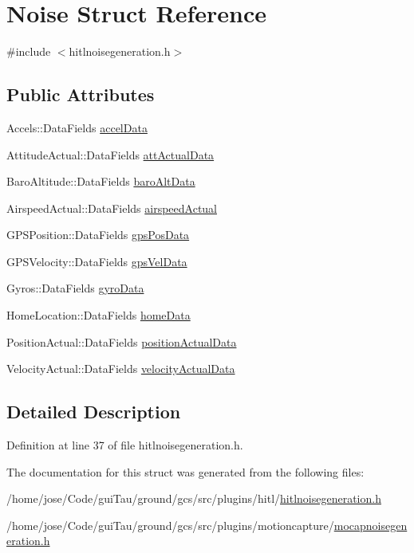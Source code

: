 \hypertarget{struct_noise}{\section{Noise Struct Reference}
\label{struct_noise}
}


{\ttfamily \#include $<$hitlnoisegeneration.\-h$>$}

\subsection*{Public Attributes}
\begin{DoxyCompactItemize}
\item 
Accels\-::\-Data\-Fields \hyperlink{group__hitlplugin_ga20a9e1e87d0a44b532c7e8c44555bdde}{accel\-Data}
\item 
Attitude\-Actual\-::\-Data\-Fields \hyperlink{group__hitlplugin_ga689a709ae944673ff6edd54ab6ca4d7d}{att\-Actual\-Data}
\item 
Baro\-Altitude\-::\-Data\-Fields \hyperlink{group__hitlplugin_gab586e8f2c72c1e42c715debf0bd202b1}{baro\-Alt\-Data}
\item 
Airspeed\-Actual\-::\-Data\-Fields \hyperlink{group__hitlplugin_ga6481423a6f6cc57475e660281ba3d77d}{airspeed\-Actual}
\item 
G\-P\-S\-Position\-::\-Data\-Fields \hyperlink{group__hitlplugin_ga9ec5e3f5256aa25ca8a8556643eb355d}{gps\-Pos\-Data}
\item 
G\-P\-S\-Velocity\-::\-Data\-Fields \hyperlink{group__hitlplugin_gafefa36e4fa6d8da826bbfcf9f604119c}{gps\-Vel\-Data}
\item 
Gyros\-::\-Data\-Fields \hyperlink{group__hitlplugin_gaf3fae05e7092b987f81f25ff7709ffb9}{gyro\-Data}
\item 
Home\-Location\-::\-Data\-Fields \hyperlink{group__hitlplugin_ga3138fe65ade5af4ff6ff614c0956fc0a}{home\-Data}
\item 
Position\-Actual\-::\-Data\-Fields \hyperlink{group__hitlplugin_ga54f9e7005f571fdacf23a67005004b0a}{position\-Actual\-Data}
\item 
Velocity\-Actual\-::\-Data\-Fields \hyperlink{group__hitlplugin_ga45f843b87142396306b05148bf19b766}{velocity\-Actual\-Data}
\end{DoxyCompactItemize}


\subsection{Detailed Description}


Definition at line 37 of file hitlnoisegeneration.\-h.



The documentation for this struct was generated from the following files\-:\begin{DoxyCompactItemize}
\item 
/home/jose/\-Code/gui\-Tau/ground/gcs/src/plugins/hitl/\hyperlink{hitlnoisegeneration_8h}{hitlnoisegeneration.\-h}\item 
/home/jose/\-Code/gui\-Tau/ground/gcs/src/plugins/motioncapture/\hyperlink{mocapnoisegeneration_8h}{mocapnoisegeneration.\-h}\end{DoxyCompactItemize}
